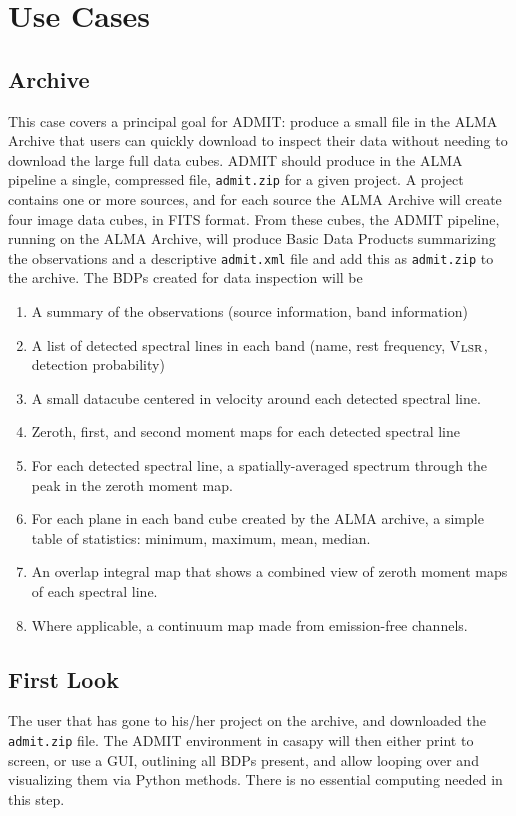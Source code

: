 \documentclass{article}
\begin{document}
\section{Use Cases}

\subsection{Archive}

This case covers a principal goal for ADMIT: produce a small file in
the ALMA Archive that users can quickly download to inspect their data
without needing to download the large full data cubes.  ADMIT should
produce in the ALMA pipeline a single, compressed file, {\tt admit.zip}
for a given project.  A project contains one or more sources, and for each
source the ALMA Archive will create four image data cubes, in FITS format.
From these cubes, the ADMIT pipeline, running on the ALMA Archive, will
produce Basic Data Products summarizing the observations and a descriptive
{\tt admit.xml} file and add this as {\tt admit.zip} to the archive.
The BDPs created for data inspection will be 
\begin{enumerate}
\item A summary of the observations (source information, band information)
\item A list of detected spectral lines in each band (name,
rest frequency, V$_{\rm LSR}$, detection probability)
\item A small datacube centered in velocity around each detected spectral line.
\item Zeroth, first, and second moment maps for each detected spectral line
\item For each detected spectral line, a spatially-averaged spectrum through the peak in the zeroth moment map.
\item For each plane in each band cube created by the ALMA archive,
a simple table of statistics: minimum, maximum, mean, median.
\item An overlap integral map that shows a combined view of zeroth moment maps of each spectral line.
\item Where applicable, a continuum map made from emission-free channels.
\end{enumerate}

\subsection{First Look}

The user that has gone to his/her project on the archive, and downloaded
the {\tt admit.zip} file. The ADMIT environment in casapy will then
either print to screen, or use a GUI, outlining all BDPs present, and
allow looping over and visualizing them via Python methods. There is no
essential computing needed in this step.
\end{document}
